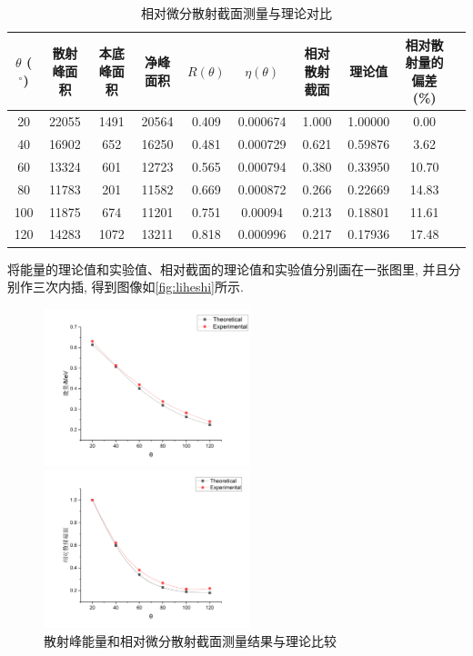 \documentclass[font=default]{mpltx}
\begin{document}
      \begin{table}[htbp]
        \centering
        \caption{相对微分散射截面测量与理论对比}
        \begin{tabular}{cccccccccc}
          \toprule
          $\theta$ ($^\circ$) & 散射峰面积 & 本底峰面积 & 净峰面积 & $R(\theta)$ & $\eta(\theta)$ & 相对散射截面 & 理论值 & 相对散射量的偏差 (\%) \\
          \midrule
          20 & 22055 & 1491 & 20564 & 0.409 & 0.000674 & 1.000 & 1.00000 & 0.00 \\
          40 & 16902 & 652 & 16250 & 0.481 & 0.000729 & 0.621 & 0.59876 & 3.62 \\
          60 & 13324 & 601 & 12723 & 0.565 & 0.000794 & 0.380 & 0.33950 & 10.70 \\
          80 & 11783 & 201 & 11582 & 0.669 & 0.000872 & 0.266 & 0.22669 & 14.83 \\
          100 & 11875 & 674 & 11201 & 0.751 & 0.00094 & 0.213 & 0.18801 & 11.61 \\
          120 & 14283 & 1072 & 13211 & 0.818 & 0.000996 & 0.217 & 0.17936 & 17.48 \\
          \bottomrule
        \end{tabular}
        \label{tab:scattering_cross_section}
      \end{table}

      将能量的理论值和实验值、相对截面的理论值和实验值分别画在一张图里, 并且分别作三次内插, 得到图像如\autoref{fig:liheshi}所示. 
      \begin{figure}[htbp]
        \centering
        \begin{minipage}[t]{0.52\textwidth}
        \centering
        \includegraphics[width=6cm]{fig/nengliang.png}
        \end{minipage}
        \begin{minipage}[t]{0.52\textwidth}
        \centering
        \includegraphics[width=6cm]{fig/jiemian.png}
        \end{minipage}
        \caption{散射峰能量和相对微分散射截面测量结果与理论比较}
        \label{fig:liheshi}
      \end{figure}
\end{document}
